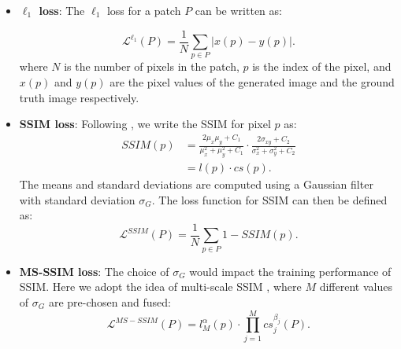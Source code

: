 \documentclass[10pt,twocolumn,letterpaper]{article}
\begin{document}
\begin{itemize}[noitemsep,topsep=2pt,parsep=2pt,partopsep=2pt]




\item \textbf{$\ell_1$ loss}: The $\ell_1$ loss for a patch $P$ can be written as:

\begin{equation}
\label{l1 error function}
\mathcal{L}^{\ell_1}(P) = \frac{1}{N}\sum_{p \in P}^{} |x(p)-y(p)|.
\end{equation}
where $N$ is the number of pixels in the patch, $p$ is the index of the pixel, and $x(p)$ and $y(p)$ are the pixel values of the generated image and the ground truth image respectively.
\item \textbf{SSIM loss}: Following \cite{zhao2017loss}, we write the SSIM for pixel $p$ as:
\begin{equation}
\label{SSIM}
\begin{split}
SSIM(p) & = \frac{2\mu_x\mu_y + C_1}{\mu_x^2+\mu_y^2+C_1}\cdot \frac{2\sigma_{xy}+C_2}{\sigma_x^2 + \sigma_y^2+C_2} \\
& =l(p)\cdot cs(p).
\end{split}
\end{equation}
The means and standard deviations are computed using a Gaussian filter with standard deviation $\sigma_G$. The loss function for SSIM can then be defined as:
\begin{equation}
\label{SSIM error function}
\mathcal{L}^{SSIM}(P) = \frac{1}{N}\sum_{p \in P}^{} 1 - SSIM(p).
\end{equation}

\item \textbf{MS-SSIM loss}: 
The choice of $\sigma_G$ would impact the training performance of SSIM. Here we adopt the idea of multi-scale SSIM \cite{zhao2017loss}, where $M$ different values of $\sigma_G$ are pre-chosen and fused:
\begin{equation}
\label{MS-SSIM}
\mathcal{L}^{MS-SSIM}(P) = l_M^\alpha(p) \cdot \prod_{j=1}^{M} cs_j^{\beta_j} (P).
\end{equation}


\end{itemize}
\end{document}

